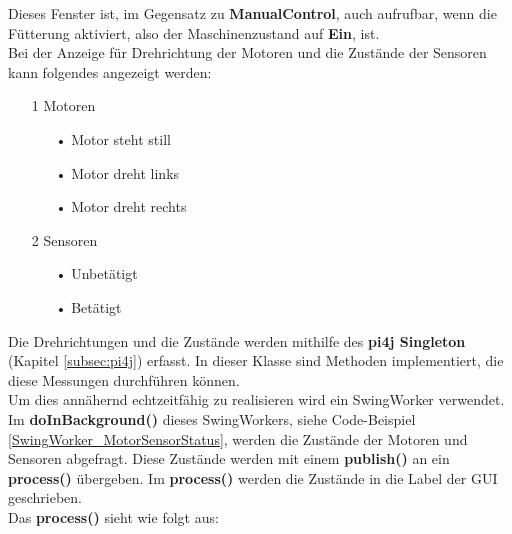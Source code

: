 Dieses Fenster ist, im Gegensatz zu \textbf{ManualControl}, auch aufrufbar, wenn die Fütterung aktiviert, also der Maschinenzustand auf \textbf{Ein}, ist.
\\ Bei der Anzeige für Drehrichtung der Motoren und die Zustände der Sensoren kann folgendes angezeigt werden:
\begin{itemize}
\item[1] Motoren
  \begin{itemize}
    \item[•] Motor steht still
    \item[•] Motor dreht links
    \item[•] Motor dreht rechts
  \end{itemize}
\item[2] Sensoren
  \begin{itemize}
    \item[•] Unbetätigt 
    \item[•] Betätigt 
  \end{itemize}
\end{itemize}

\vspace{10pt}

Die Drehrichtungen und die Zustände werden mithilfe des \textbf{\ac{pi4j} Singleton} (Kapitel \ref{subsec:pi4j}) erfasst. In dieser Klasse sind Methoden implementiert, die diese Messungen durchführen können.
\\ Um dies annähernd echtzeitfähig zu realisieren wird ein SwingWorker verwendet. Im \textbf{doInBackground()} dieses SwingWorkers, siehe Code-Beispiel \ref{SwingWorker_MotorSensorStatus}, werden die Zustände der Motoren und Sensoren abgefragt. Diese Zustände werden mit einem \textbf{publish()} an ein \textbf{process()} übergeben. Im \textbf{process()} werden die Zustände in die Label der \ac{GUI} geschrieben.
\\ Das \textbf{process()} sieht wie folgt aus:

\newpage

